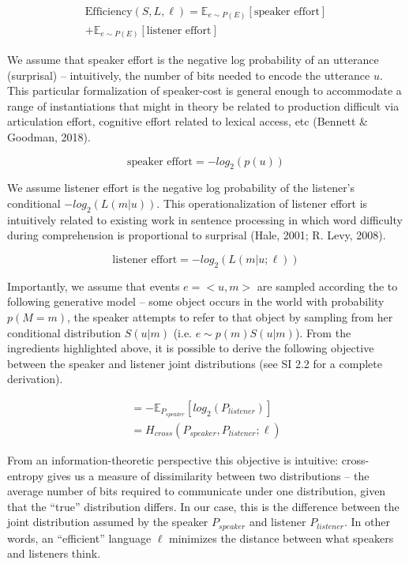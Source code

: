 \documentclass[10pt, letterpaper]{article}
\begin{document}
\begin{equation}
\begin{split}
  \text{Efficiency}(S, L, \ell) = \mathbb{E}_{e \sim P(E)}[\text{speaker effort}] \\+ \mathbb{E}_{e \sim P(E)}[\text{listener effort}]
\end{split}
\end{equation}

We assume that speaker effort is the negative log probability of an
utterance (surprisal) -- intuitively, the number of bits needed to
encode the utterance \(u\). This particular formalization of
speaker-cost is general enough to accommodate a range of instantiations
that might in theory be related to production difficult via articulation
effort, cognitive effort related to lexical access, etc (Bennett \&
Goodman, 2018).\par

\[\text{speaker effort} = -log_2(p(u))\]

We assume listener effort is the negative log probability of the
listener's conditional \(-log_2(L(m|u))\). This operationalization of
listener effort is intuitively related to existing work in sentence
processing in which word difficulty during comprehension is proportional
to surprisal (Hale, 2001; R. Levy, 2008).

\[\text{listener effort} = -log_2(L(m|u; \ell))\]

Importantly, we assume that events \(e = <u, m>\) are sampled according
the to following generative model -- some object occurs in the world
with probability \(p(M=m)\), the speaker attempts to refer to that
object by sampling from her conditional distribution \(S(u|m)\) (i.e.
\(e \sim p(m)S(u|m)\)). From the ingredients highlighted above, it is
possible to derive the following objective between the speaker and
listener joint distributions (see SI 2.2 for a complete derivation).

\begin{equation}
\begin{split}
  = -\mathbb{E}_{P_{speaker}}[log_2(P_{listener})] \\
  = H_{cross}(P_{speaker}, P_{listener}; \ell)
\end{split}
\end{equation}

From an information-theoretic perspective this objective is intuitive:
cross-entropy gives us a measure of dissimilarity between two
distributions -- the average number of bits required to communicate
under one distribution, given that the ``true'' distribution differs. In
our case, this is the difference between the joint distribution assumed
by the speaker \(P_{speaker}\) and listener \(P_{listener}\). In other
words, an ``efficient'' language \(\ell\) minimizes the distance between
what speakers and listeners think.
\end{document}
